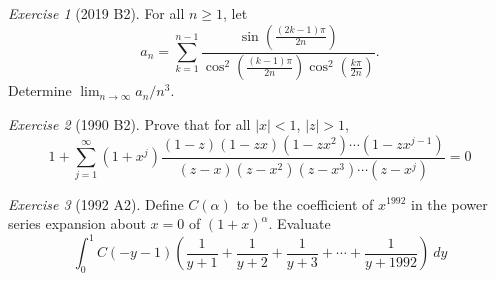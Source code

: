 \documentclass{article}
\theoremstyle{definition}
\theoremstyle{remark}
\newtheorem{exercise}{Exercise}
\begin{document}
\begin{exercise}[2019 B2]
    For all \(n\geq 1\), let
    \[a_n = \sum_{k=1}^{n-1}\frac{\sin\left(\frac{(2k-1)\pi}{2n}\right)}{\cos^2\left(\frac{(k-1)\pi}{2n}\right)\cos^2\left(\frac{k\pi}{2n}\right)}.\]
    Determine $\lim_{n\to\infty}a_n /n^3$.
\end{exercise}

\begin{exercise}[1990 B2]
Prove that for all $|x|<1$, $|z|>1$, 
\[1+\sum_{j=1}^\infty (1+x^j)\frac{(1-z)(1-zx)(1-zx^2)\cdots(1-zx^{j-1})}{(z-x)(z-x^2)(z-x^3)\cdots(z-x^j)} = 0\]
\end{exercise}

\begin{exercise}[1992 A2]
Define $C(\alpha)$ to be the coefficient of $x^{1992}$ in the power series expansion about $x=0$ of $(1+x)^\alpha$. Evaluate
\[\int_0^1 C(-y-1)\left(\frac{1}{y+1}+\frac{1}{y+2}+\frac{1}{y+3}+\cdots + \frac{1}{y+1992}\right)\ dy\]
\end{exercise}
\end{document}
